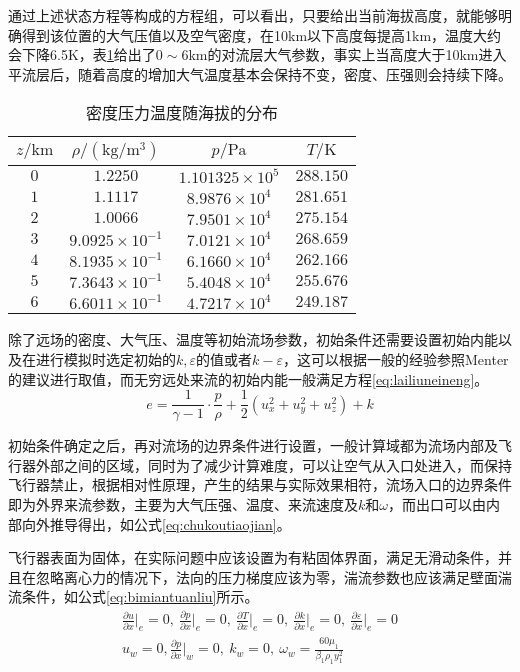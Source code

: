 通过上述状态方程等构成的方程组，可以看出，只要给出当前海拔高度，就能够明确得到该位置的大气压值以及空气密度，在10km以下高度每提高1km，温度大约会下降6.5K，表\ref{tab:haibacanshu}给出了$0\sim6$km的对流层大气参数，事实上当高度大于10km进入平流层后，随着高度的增加大气温度基本会保持不变，密度、压强则会持续下降。
\begin{table}[tbhp]
\centering
\caption{密度压力温度随海拔的分布}
\label{tab:haibacanshu}
\begin{tabular}{|c|c|c|c|}
\hline
$z/\text{km}$&$\rho/(\text{kg}/\text{m}^3)$&$p/\text{Pa}$&$T/\text{K}$\\\hline
$0$&$1.2250$&$1.101325\times10^5$&$288.150$\\\hline
$1$&$1.1117$&$8.9876\times10^4$&$281.651$\\\hline
$2$&$1.0066$&$7.9501\times10^4$&$275.154$\\\hline
$3$&$9.0925\times10^{-1}$&$7.0121\times10^4$&$268.659$\\\hline
$4$&$8.1935\times10^{-1}$&$6.1660\times10^4$&$262.166$\\\hline
$5$&$7.3643\times10^{-1}$&$5.4048\times10^4$&$255.676$\\\hline
$6$&$6.6011\times10^{-1}$&$4.7217\times10^4$&$249.187$\\\hline
\end{tabular}
\end{table}

除了远场的密度、大气压、温度等初始流场参数，初始条件还需要设置初始内能以及在进行模拟时选定初始的$k,\varepsilon$的值或者$k-\varepsilon$，这可以根据一般的经验参照Menter\cite{menter1994}的建议进行取值，而无穷远处来流的初始内能一般满足方程\eqref{eq:lailiuneineng}。
\begin{equation}
e=\frac{1}{\gamma-1}\cdot\frac{p}{\rho}+\frac{1}{2}(u_x^2+u_y^2+u_z^2)+k
\label{eq:lailiuneineng}
\end{equation}

初始条件确定之后，再对流场的边界条件进行设置，一般计算域都为流场内部及飞行器外部之间的区域，同时为了减少计算难度，可以让空气从入口处进入，而保持飞行器禁止，根据相对性原理，产生的结果与实际效果相符，流场入口的边界条件即为外界来流参数，主要为大气压强、温度、来流速度及$k$和$\omega$，而出口可以由内部向外推导得出，如公式\eqref{eq:chukoutiaojian}。

飞行器表面为固体，在实际问题中应该设置为有粘固体界面，满足无滑动条件，并且在忽略离心力的情况下，法向的压力梯度应该为零，湍流参数也应该满足壁面湍流条件，如公式\eqref{eq:bimiantuanliu}所示。
\begin{gather}
\frac{\partial u}{\partial x}\bigg\vert_e=0,~
\frac{\partial p}{\partial x}\bigg\vert_e=0,~
\frac{\partial T}{\partial x}\bigg\vert_e=0,~
\frac{\partial k}{\partial x}\bigg\vert_e=0,~
\frac{\partial \varepsilon}{\partial x}\bigg\vert_e=0
\label{eq:chukoutiaojian}\\
u_w=0,
\frac{\partial p}{\partial x}\bigg\vert_w=0,~
k_w=0,~
\omega_w=
\frac{60\mu_1}{\beta_1\rho_1y_1^2}
\label{eq:bimiantuanliu}
\end{gather}

